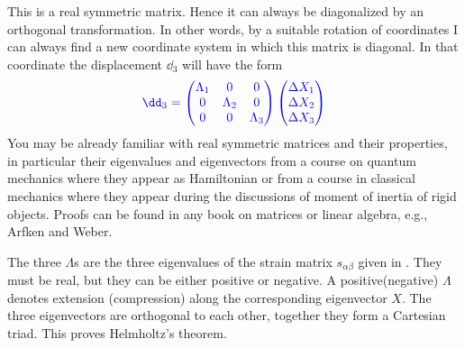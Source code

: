 \documentclass{tufte-book} %
\begin{document}
This is a real symmetric matrix. Hence it can always be diagonalized
by an orthogonal transformation. In other words, by a suitable
rotation of coordinates I can always find a new coordinate system in
which this matrix is diagonal. In that coordinate the displacement $\dd_3$
will have the form
\begin{equation}
{\color{blue}\dd_3 = 
\begin{pmatrix}
\Lambda_{1} & 0 & 0  \\
0 &  \Lambda_{2} & 0  \\
0 & 0 & \Lambda_{3} 
\end{pmatrix}
\begin{pmatrix}
\Delta X_1 \\ \Delta X_2  \\ \Delta X_3
\end{pmatrix}
}
\label{eq:diag}
\end{equation}
You may be already familiar with real symmetric matrices and their properties,
in particular their eigenvalues and eigenvectors from a course on
quantum mechanics where they appear as Hamiltonian or 
from a course in classical mechanics where they appear during the
discussions of moment of inertia of rigid objects. Proofs can be found
in any book on matrices or linear algebra, e.g., Arfken and Weber\cite{Arfken}.

The three $\Lambda$s are the three eigenvalues of the strain matrix
$s_{\alpha\beta}$ given in . They must be real, but
they can be either positive or negative. A positive(negative)
$\Lambda$ denotes extension (compression) along the corresponding 
eigenvector $X$. The three eigenvectors are orthogonal to each other,
together they form a Cartesian triad. 
This proves Helmholtz's theorem. 
\end{document}
